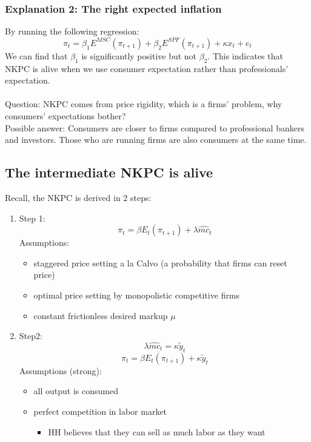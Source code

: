 \documentclass{article}
\begin{document}
\subsubsection{Explanation 2: The right expected inflation}
By running the following regression:
$$\pi_t = \beta_1 E^{MSC}(\pi_{t+1}) + \beta_2 E^{SPF}(\pi_{t+1}) + \kappa x_t + e_t$$
We can find that $\beta_1$ is significantly positive but not $\beta_2$. This indicates that NKPC is alive when we use consumer expectation rather than professionals' expectation. \\
\\
{\color{red}Question: NKPC comes from price rigidity, which is a firms' problem, why consumers' expectations bother?\\
Possible answer: Consumers are closer to firms compared to professional bankers and investors. Those who are running firms are also consumers at the same time.}

\subsection{The intermediate NKPC is alive}
Recall, the NKPC is derived in 2 steps:
\begin{enumerate}
    \item Step 1:
    $$\pi_t = \beta E_t (\pi_{t+1}) + \lambda \hat{mc}_t$$
    Assumptions:
    \begin{itemize}
        \item staggered price setting a la Calvo (a probability that firms can reset price)
        \item optimal price setting by monopolistic competitive firms
        \item constant frictionless desired markup $\mu$\\
    \end{itemize}

    \item Step2: 
    $$\lambda \hat{mc}_t = \kappa \tilde{y}_t$$
    $$\pi_t = \beta E_t (\pi_{t+1}) + \kappa \tilde{y}_t$$
    Assumptions (strong):
    \begin{itemize}
        \item all output is consumed
        \item perfect competition in labor market
        \begin{itemize}
            \item HH believes that they can sell as much labor as they want
        \end{itemize}
    \end{itemize}
\end{enumerate}
\end{document}
